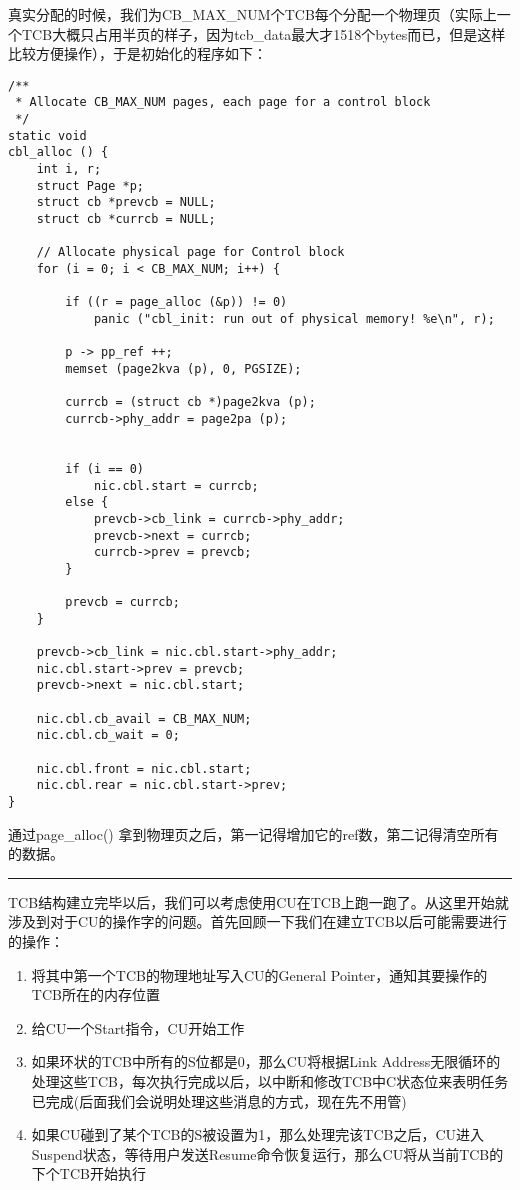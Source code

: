 \documentclass{article}
\newcommand{\funcname}[1]{{\ttfamily \small #1}}
\begin{document}
\begin{CJK*}{UTF8}{gkai}
\vspace{2em}

真实分配的时候，我们为CB\_MAX\_NUM个TCB每个分配一个物理页（实际上一个TCB大概只占用半页的样子，因为tcb\_data最大才1518个bytes而已，但是这样比较方便操作），于是初始化的程序如下：

\label{cblalloc}

\begin{lstlisting}[style=ccode, title={\scriptsize \ttfamily \bfseries kern/e100.c: cbl\_alloc()}]
/**
 * Allocate CB_MAX_NUM pages, each page for a control block
 */
static void
cbl_alloc () {
    int i, r;
    struct Page *p;
    struct cb *prevcb = NULL;
    struct cb *currcb = NULL;

    // Allocate physical page for Control block
    for (i = 0; i < CB_MAX_NUM; i++) {

        if ((r = page_alloc (&p)) != 0)
            panic ("cbl_init: run out of physical memory! %e\n", r);

        p -> pp_ref ++;
        memset (page2kva (p), 0, PGSIZE);

        currcb = (struct cb *)page2kva (p);
        currcb->phy_addr = page2pa (p);


        if (i == 0)
            nic.cbl.start = currcb;
        else {
            prevcb->cb_link = currcb->phy_addr;
            prevcb->next = currcb;
            currcb->prev = prevcb;
        }

        prevcb = currcb;
    }

    prevcb->cb_link = nic.cbl.start->phy_addr;
    nic.cbl.start->prev = prevcb;
    prevcb->next = nic.cbl.start;

    nic.cbl.cb_avail = CB_MAX_NUM;
    nic.cbl.cb_wait = 0;

    nic.cbl.front = nic.cbl.start;
    nic.cbl.rear = nic.cbl.start->prev;
}
\end{lstlisting}

通过\funcname{page\_alloc()} 拿到物理页之后，第一记得增加它的ref数，第二记得清空所有的数据。

\vspace{2em}
\hrule
\vspace{2em}

TCB结构建立完毕以后，我们可以考虑使用CU在TCB上跑一跑了。从这里开始就涉及到对于CU的操作字的问题。首先回顾一下我们在建立TCB以后可能需要进行的操作：

\begin{enumerate}
\item{将其中第一个TCB的物理地址写入CU的General Pointer，通知其要操作的TCB所在的内存位置}
\item{给CU一个Start指令，CU开始工作}
\item{如果环状的TCB中所有的S位都是0，那么CU将根据Link Address无限循环的处理这些TCB，每次执行完成以后，以中断和修改TCB中C状态位来表明任务已完成(后面我们会说明处理这些消息的方式，现在先不用管)}
\item{如果CU碰到了某个TCB的S被设置为1，那么处理完该TCB之后，CU进入Suspend状态，等待用户发送Resume命令恢复运行，那么CU将从当前TCB的下个TCB开始执行}
\end{enumerate}


\end{CJK*}
\end{document}
